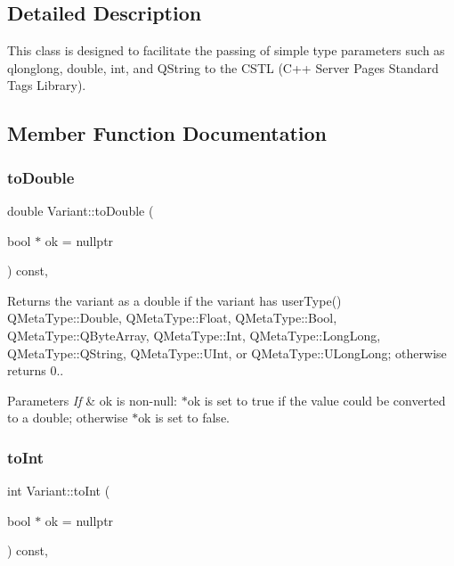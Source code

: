\subsection{Detailed Description}
This class is designed to facilitate the passing of simple type parameters such as qlonglong, double, int, and Q\+String to the C\+S\+TL (C++ Server Pages Standard Tags Library). 

\subsection{Member Function Documentation}
\mbox{\label{class_variant_a543a5e6579cea7fcd8e6413921e8fd44}} 
\subsubsection{\texorpdfstring{to\+Double}{toDouble}}
{\footnotesize\ttfamily double Variant\+::to\+Double (\begin{DoxyParamCaption}\item[{bool $\ast$}]{ok = {\ttfamily nullptr} }\end{DoxyParamCaption}) const\hspace{0.3cm}{\ttfamily [inline]}, {\ttfamily [slot]}}



Returns the variant as a double if the variant has user\+Type() Q\+Meta\+Type\+::\+Double, Q\+Meta\+Type\+::\+Float, Q\+Meta\+Type\+::\+Bool, Q\+Meta\+Type\+::\+Q\+Byte\+Array, Q\+Meta\+Type\+::\+Int, Q\+Meta\+Type\+::\+Long\+Long, Q\+Meta\+Type\+::\+Q\+String, Q\+Meta\+Type\+::\+U\+Int, or Q\+Meta\+Type\+::\+U\+Long\+Long; otherwise returns 0.. 


\begin{DoxyParams}{Parameters}
{\em If} & ok is non-\/null\+: $\ast$ok is set to true if the value could be converted to a double; otherwise $\ast$ok is set to false. \\
\hline
\end{DoxyParams}
\mbox{\label{class_variant_ae38d113834d5d53ca9c7f36366a25288}} 
\subsubsection{\texorpdfstring{to\+Int}{toInt}}
{\footnotesize\ttfamily int Variant\+::to\+Int (\begin{DoxyParamCaption}\item[{bool $\ast$}]{ok = {\ttfamily nullptr} }\end{DoxyParamCaption}) const\hspace{0.3cm}{\ttfamily [inline]}, {\ttfamily [slot]}}




